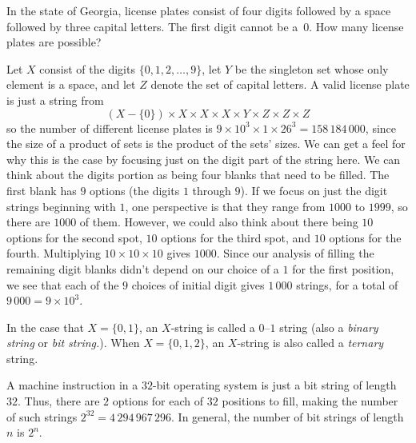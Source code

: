\begin{example}\label{exa:strings:ga-plate}
  In the state of Georgia, license plates consist of four digits
  followed by a space followed by three capital letters. The first
  digit cannot be a~$0$.  How many license plates are possible?

  \medskip Let $X$ consist of the digits $\{0,1,2,\dots,9\}$, let $Y$
  be the singleton set whose only element is a space, and let $Z$
  denote the set of capital letters.  A valid license plate is just a
  string from
  \[
  (X-\{0\})\times X\times X\times X\times Y\times Z\times Z\times Z
  \]
  so the number of different license plates is
  $9\times10^3\times1\times 26^3=158\,184\,000$, since the size of a
  product of sets is the product of the sets' sizes. We can get a feel
  for why this is the case by focusing just on the digit part of the
  string here. We can think about the digits portion as being four
  blanks that need to be filled. The first blank has $9$ options (the
  digits $1$ through $9$). If we focus on just the digit strings
  beginning with $1$, one perspective is that they range from $1000$
  to $1999$, so there are $1000$ of them. However, we could also think
  about there being $10$ options for the second spot, $10$ options for
  the third spot, and $10$ options for the fourth. Multiplying
  $10\times 10\times 10$ gives $1000$. Since our analysis of filling
  the remaining digit blanks didn't depend on our choice of a $1$ for
  the first position, we see that each of the $9$ choices of initial
  digit gives $1\, 000$ strings, for a total of $9\,000 = 9\times 10^3$.
\end{example}

In the case that $X=\{0,1\}$, an $X$-string is called a $0$--$1$
string (also a \emph{binary string} or \textit{bit string.}).  When $X=\{0,1,2\}$, an
$X$-string is also called a \textit{ternary} string.

\begin{example}
  A machine instruction in a $32$-bit operating system is just a bit
  string of length~$32$. Thus, there are $2$ options for each of $32$
  positions to fill, making the number of such strings $2^{32} =
  4\,294\,967\,296$.  In general, the number of bit strings of length~$n$ is
  $2^n$.
\end{example}

